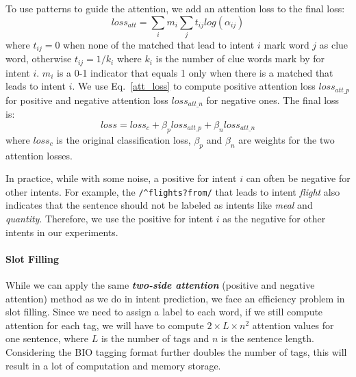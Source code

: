 To use \RE patterns to guide the attention, we add an attention loss to the final loss:
\begin{equation}
loss_{att} = \sum_{i}{m_i\sum_{j}{t_{ij}log(\alpha_{ij})}}
\label{att_loss}
\end{equation}
where $t_{ij} = 0$ when none of the matched \REs that lead to intent $i$ mark word $j$ as clue word, otherwise $t_{ij} = 1/k_{i}$ where $k_i$ is the number of clue words mark by \RE for intent $i$. $m_i$ is a 0-1 indicator that equals 1 only when there is a matched \RE that leads to intent $i$. We use Eq.~\ref{att_loss} to compute positive attention loss $loss_{att\_p}$ for positive \REs and negative attention loss $loss_{att\_n}$ for negative ones. The final loss is:
\begin{equation}
loss = loss_{c} + \beta_p loss_{att\_p} + \beta_n loss_{att\_n}
\end{equation}
where $loss_{c}$ is the original classification loss, $\beta_p$ and $\beta_n$ are weights for the two attention losses.

In practice, while with some noise, a positive \RE for intent $i$ can often be negative \REs for other intents. For example, the \RE \texttt{/\textasciicircum flights?\:from/} that leads to intent \emph{flight} also indicates that the sentence should not be labeled as intents like \emph{meal} and \emph{quantity}.
Therefore, we use the positive \REs for intent $i$ as the negative \REs for other intents in our experiments.

\paragraph{Slot Filling}
While we can apply the same \textbf{\emph{two-side attention}} (positive and negative attention) method as we do in intent prediction, we face an efficiency problem in slot filling.
Since we need to assign a label to each word, if we still compute attention for each tag, we will have to compute $2\times L \times n^2$ attention values for one sentence, where $L$ is the number of tags and $n$ is the sentence length. Considering the BIO tagging format further doubles the number of tags, this will result in a lot of computation and memory storage.

